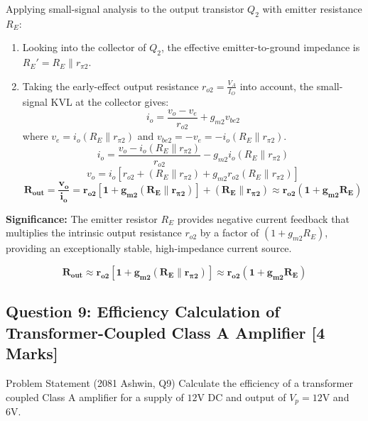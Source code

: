 \documentclass[11pt,a4paper,oneside]{book}
\begin{document}
Applying small-signal analysis to the output transistor $Q_2$ with emitter resistance $R_E$:
\begin{enumerate}[leftmargin=1.5em]
  \item Looking into the collector of $Q_2$, the effective emitter-to-ground impedance is $R_E' = R_E \parallel r_{\pi 2}$.
  \item Taking the early-effect output resistance $r_{o2} = \frac{V_A}{I_O}$ into account, the small-signal KVL at the collector gives:
  \[
  i_o = \frac{v_o - v_e}{r_{o2}} + g_{m2} v_{be2}
  \]
  where $v_e = i_o (R_E \parallel r_{\pi 2})$ and $v_{be2} = -v_e = -i_o (R_E \parallel r_{\pi 2})$.
  \[
  i_o = \frac{v_o - i_o(R_E \parallel r_{\pi 2})}{r_{o2}} - g_{m2} i_o (R_E \parallel r_{\pi 2})
  \]
  \[
  v_o = i_o \left[ r_{o2} + (R_E \parallel r_{\pi 2}) + g_{m2} r_{o2} (R_E \parallel r_{\pi 2}) \right]
  \]
  \[
  \mathbf{R_{\text{out}} = \frac{v_o}{i_o} = r_{o2} \left[ 1 + g_{m2} (R_E \parallel r_{\pi 2}) \right] + (R_E \parallel r_{\pi 2}) \approx r_{o2} \left( 1 + g_{m2} R_E \right)}
  \]
\end{enumerate}
\textbf{Significance:} The emitter resistor $R_E$ provides negative current feedback that multiplies the intrinsic output resistance $r_{o2}$ by a factor of $(1 + g_{m2} R_E)$, providing an exceptionally stable, high-impedance current source.

\begin{answerbox}
$$\mathbf{R_{\text{out}} \approx r_{o2} \left[ 1 + g_{m2} (R_E \parallel r_{\pi 2}) \right] \approx r_{o2}(1 + g_{m2} R_E)}$$
\end{answerbox}

\vspace{0.6cm}

\subsection{Question 9: Efficiency Calculation of Transformer-Coupled Class A Amplifier [4 Marks]}
\begin{questionbox}{Problem Statement (2081 Ashwin, Q9)}
Calculate the efficiency of a transformer coupled Class A amplifier for a supply of $12\text{V DC}$ and output of $V_p = 12\text{V}$ and $6\text{V}$.
\end{questionbox}
\end{document}
